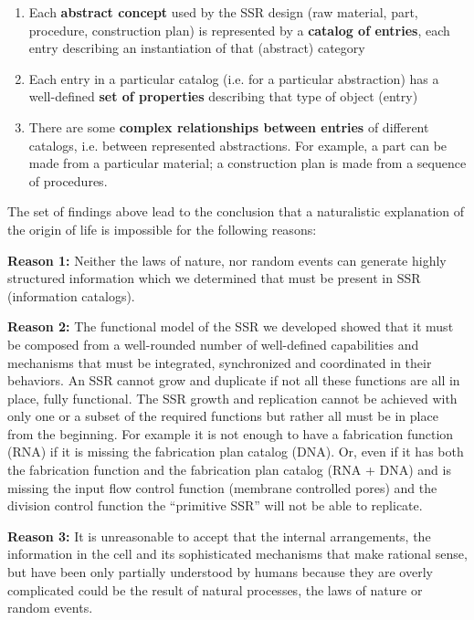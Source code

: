 \begin{enumerate}
\begin{enumerate}
\item Each \textbf{abstract concept} used by the SSR design (raw
material, part, procedure, construction plan) is represented by a
\textbf{catalog of entries}, each entry describing an instantiation of
that (abstract) category
\item Each entry in a particular catalog (i.e. for a particular
abstraction) has a well-defined \textbf{set of properties} describing
that type of object (entry)
\item There are some \textbf{complex relationships between entries} of
different catalogs, i.e. between represented abstractions. For example,
a part can be made from a particular material; a construction plan is
made from a sequence of procedures.
\end{enumerate}
\end{enumerate}

The set of findings above lead to the conclusion that a naturalistic
explanation of the origin of life is impossible for the following
reasons:

\textbf{Reason 1:}  Neither the laws of nature, nor random events can
generate highly structured information which we determined that must be
present in SSR (information catalogs).

\textbf{Reason 2:}  The functional model of the SSR we developed showed
that it must be composed from a well-rounded number of well-defined
capabilities and mechanisms that must be integrated, synchronized and
coordinated in their behaviors. An SSR cannot grow and duplicate if not
all these functions are all in place, fully functional. The SSR growth
and replication cannot be achieved with only one or a subset of the
required functions but rather all must be in place from the beginning.
For example it is not enough to have a fabrication function (RNA) if it
is missing the fabrication plan catalog (DNA). Or, even if it has both
the fabrication function and the fabrication plan catalog (RNA + DNA)
and is missing the input flow control function (membrane controlled
pores) and the division control function the “primitive SSR” will not
be able to replicate.

\textbf{Reason 3:} It is unreasonable to accept that the internal
arrangements, the information in the cell and its sophisticated
mechanisms that make rational sense, but have been only partially
understood by humans because they are overly complicated could be the
result of natural processes, the laws of nature or random events.


